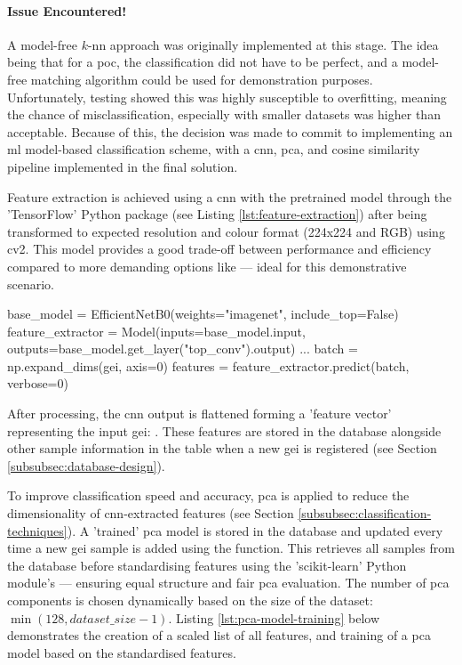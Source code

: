 \begin{tcolorbox}[colback=red!5, boxrule=0pt, frame empty]
	\paragraph{Issue Encountered!} A model-free $k$-\ac{nn} approach was originally implemented at this stage. The idea being that for a \ac{poc}, the classification did not have to be perfect, and a model-free matching algorithm could be used for demonstration purposes.
	Unfortunately, testing showed this was highly susceptible to overfitting, meaning the chance of misclassification, especially with smaller datasets was higher than acceptable.
	Because of this, the decision was made to commit to implementing an \ac{ml} model-based classification scheme, with a \ac{cnn}, \ac{pca}, and cosine similarity pipeline implemented in the final solution.
\end{tcolorbox}

Feature extraction is achieved using a \ac{cnn} with the pretrained  model through the 'TensorFlow' Python package (see Listing \ref{lst:feature-extraction}) after being transformed to expected resolution and colour format (224x224 and RGB) using \ac{cv2}.
This model provides a good trade-off between performance and efficiency compared to more demanding options like  --- ideal for this demonstrative scenario.

\begin{code}
base_model = EfficientNetB0(weights="imagenet", include_top=False)
feature_extractor = Model(inputs=base_model.input, outputs=base_model.get_layer("top_conv").output)
...
batch = np.expand_dims(gei, axis=0)
features = feature_extractor.predict(batch, verbose=0)
\end{code}
\label{lst:feature-extraction} \vspace{10pt}

After processing, the \ac{cnn} output is flattened forming a 'feature vector' representing the input \ac{gei}: .
These features are stored in the database alongside other sample information in the  table when a new \ac{gei} is registered (see Section \ref{subsubsec:database-design}).

To improve classification speed and accuracy, \ac{pca} is applied to reduce the dimensionality of \ac{cnn}-extracted features (see Section \ref{subsubsec:classification-techniques}).
A 'trained' \ac{pca} model is stored in the database and updated every time a new \ac{gei} sample is added using the  function.
This retrieves all samples from the database before standardising features using the 'scikit-learn' Python module's  --- ensuring equal structure and fair \ac{pca} evaluation.
The number of \ac{pca} components is chosen dynamically based on the size of the dataset: $\min(128, \mathit{dataset\_size}-1)$.
Listing \ref{lst:pca-model-training} below demonstrates the creation of a scaled list of all features, and training of a \ac{pca} model based on the standardised features. 

